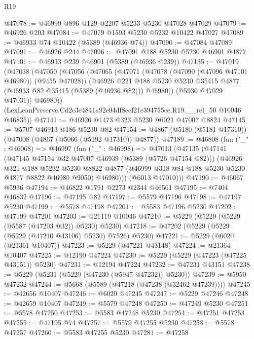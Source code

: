 \begin{lexlean}{R19}
\begin{coremodule}
@47078 := @46999 @896 @129 @2207 @5233 @5230 @47028 @47029
@47079 := @46926 @203
@47084 := @47079 @1593 @5230 @5232 @10422 @47027
@47089 := @46933 @74 @10422 (@5389 (@46936 @74))
@47090 := @47084 @47089
@47091 := @46926 @244
@47096 := @47091 @188 @5230 @5230 @46901 @4877
@47101 := @46933 @239 @46901 (@5389 (@46936 @239))
@47135 := @47019
    (@47038
      (@47050
        (@47056
          (@47065
            (@47071
              (@47078 (@47090 (@47096 @47101 @46980)) (@9455 @47028))
              (@46926
                @221
                @188
                @5230
                @5230
                @35415
                @4877
                (@46933 @82 @35415 (@5389 (@46936 @82)))
                @46980))
            (@5930 @47029 @47031))
          @46980))
      (LexLeanPreserve.Cd2c3e4841a92e04df8eef21e394755ce.R19.__rel_50 @10046 @46835))
@47141 := @46926 @1473 @323 @5230 @6021 @47007 @8824
@47145 := @5707 @46913 @186 @5230 @82
@47154 := @4867 (@5180 (@5181 @17310)) (@47008 (@4867 (@5066 (@5192 @17310)) @4877))
@47189 := @46808
    (fun ("_" : @46068) =>
    @46997
      (fun ("_" : @46998) =>
      @47013
        (@47135
          (@47141
            (@47145 @47154 @32 @47007 @46939 (@5389 (@5726 @47154 @82)))
            (@46926
              @321
              @188
              @5232
              @5230
              @8822
              @4877
              (@46999 @318 @84 @188 @5230 @5230 @4877 @8822 @46980 @9050)
              @46980)))
        (@6013 @47010)))
@47190 := @46067 @5936
@47194 := @46822 @1791 @2273 @2344 @46561
@47195 := @7404 @46832
@47196 := @47195 @82
@47197 := @5579 @47196
@47198 := @47197 @5230
@47199 := @5578 @47198
@47201 := @5583 @47196 @5230
@47202 := @47199 @47201
@47203 := @21119 @10046
@47210 := @5229 (@5229 (@5229 (@5587 (@47203 @32)) @5230) @5230)
@47218 := @47202 (@5229 (@5229 (@5229 (@47210 @43106) @5230) @7526) @5230)
@47221 := @5229 (@6020 (@21361 @10407))
@47223 := @5229 (@47221 @43148)
@47224 := @21364 @10407
@47225 := @12190 @47224
@47230 := @5229 (@5229 (@47223 (@47225 @43151)) @5230)
@47231 := @12194 @47224
@47232 := @47231 @43151
@47238 := @5229 (@5231 (@5229 (@47230 (@5947 @47232)) @5230))
@47239 := @5950 @47232
@47244 := @5668 (@5589 (@47218 (@47238 (@32462 @47239))))
@47245 := @42656 @10407
@47246 := @6020 @47245
@47247 := @5229 @47246
@47248 := @42659 @10407
@47249 := @5579 @47248
@47250 := @47249 @5230
@47251 := @5578 @47250
@47253 := @5583 @47248 @5230
@47254 := @47251 @47253
@47255 := @47195 @74
@47257 := @5579 @47255 @5230
@47258 := @5578 @47257
@47260 := @5583 @47255 @5230
@47281 := @47258

\end{coremodule}
\end{lexlean}
